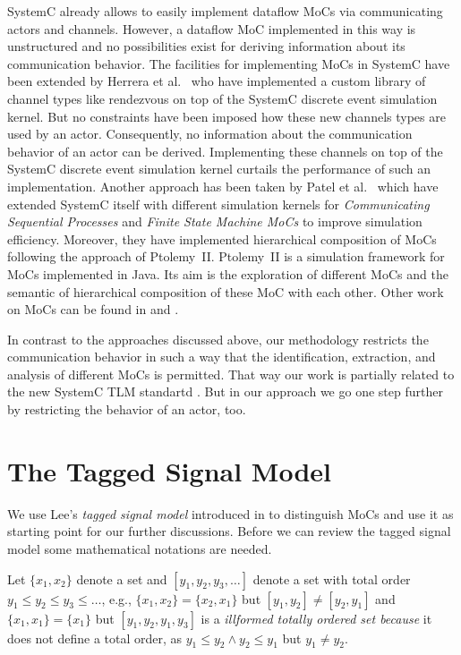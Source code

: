 SystemC \cite{glms:2002} already allows to easily implement
dataflow MoCs via communicating actors and  channels.
However, a dataflow MoC implemented in this way is unstructured
and no possibilities exist for deriving information about its
communication behavior. The facilities for implementing MoCs in
SystemC have been extended by Herrera et al.~\cite{herrerasystemc:2004}
who have implemented a custom library of channel types like rendezvous
on top of the SystemC discrete event simulation kernel. But no
constraints have been imposed how these new channels types are used by
an actor. Consequently, no information about the communication behavior
of an actor can be derived.
Implementing these channels on top of the SystemC discrete event
simulation kernel curtails the performance of such an implementation.
Another approach has been taken by Patel et al.~\cite{fermatmoc:2004}
which have extended SystemC itself with different simulation kernels
for \emph{Communicating Sequential Processes} and \emph{Finite State Machine MoCs}
to improve simulation efficiency. Moreover,
they have implemented hierarchical composition of MoCs following
the approach of \hbox{Ptolemy II}. \hbox{Ptolemy II} \cite{ptolemyII} is a simulation
framework for MoCs implemented in Java. Its aim is the exploration of
different MoCs and the semantic of hierarchical composition of these MoC
with each other. Other work on MoCs can be found in \cite{ZERTT99a} and
\cite{STZETG00}.

In contrast to the approaches discussed above, our methodology restricts
the communication behavior in such a way that the identification,
extraction, and analysis of different MoCs is permitted. That way
our work is partially related to the new SystemC TLM standartd \cite{SystemC-TLM05}.
But in our approach we go one step further by restricting the behavior
of an actor, too.

\section{The Tagged Signal Model}\label{lee-tsm}

We use Lee's \emph{tagged signal model} introduced in \cite{ls:1998} to
distinguish MoCs and use it as starting point for our further
discussions. Before we can review the tagged signal model some mathematical
notations are needed.

Let $\{x_1,x_2\}$ denote a set and $[y_1,y_2,y_3,\ldots]$ denote a set
with total order $y_1 \le y_2 \le y_3 \le \ldots$, e.g., $\{x_1,x_2\} = \{x_2,x_1\}$ but
$[y_1,y_2] \ne [y_2,y_1]$ and $\{x_1,x_1\} = \{x_1\}$ but $[ y_1, y_2, y_1, y_3]$
is a \emph{illformed totally ordered set because} it does not define a total order,
as $y_1 \le y_2 \wedge y_2 \le y_1$ but $y_1 \ne y_2$.

